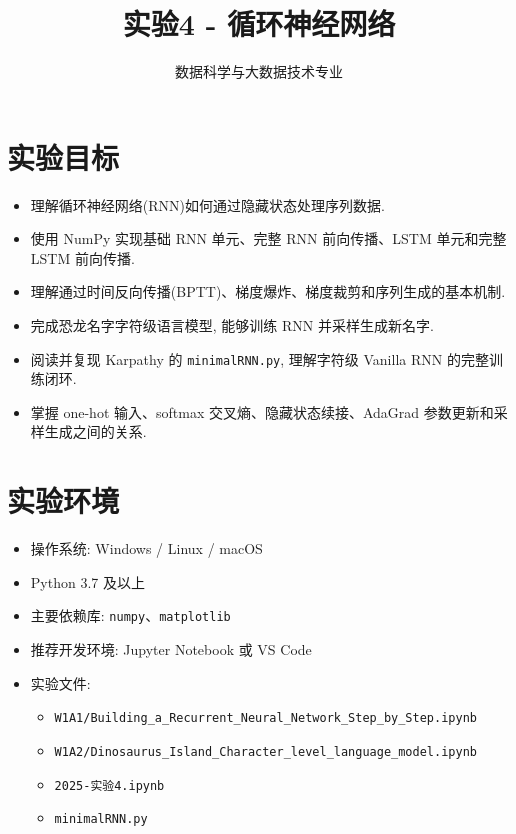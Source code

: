 \documentclass{../../nndlcourse}
\begin{document}
\title{实验4 - 循环神经网络}
\author{数据科学与大数据技术专业}
\date{}
\maketitle


\section{实验目标}
\begin{itemize}
    \item 理解循环神经网络(RNN)如何通过隐藏状态处理序列数据.
    \item 使用 NumPy 实现基础 RNN 单元、完整 RNN 前向传播、LSTM 单元和完整 LSTM 前向传播.
    \item 理解通过时间反向传播(BPTT)、梯度爆炸、梯度裁剪和序列生成的基本机制.
    \item 完成恐龙名字字符级语言模型, 能够训练 RNN 并采样生成新名字.
    \item 阅读并复现 Karpathy 的 \texttt{minimalRNN.py}, 理解字符级 Vanilla RNN 的完整训练闭环.
    \item 掌握 one-hot 输入、softmax 交叉熵、隐藏状态续接、AdaGrad 参数更新和采样生成之间的关系.
\end{itemize}


\section{实验环境}
\begin{itemize}
    \item 操作系统: Windows / Linux / macOS
    \item Python 3.7 及以上
    \item 主要依赖库: \texttt{numpy}、\texttt{matplotlib}
    \item 推荐开发环境: Jupyter Notebook 或 VS Code
    \item 实验文件:
    \begin{itemize}
        \item \texttt{W1A1/Building\_a\_Recurrent\_Neural\_Network\_Step\_by\_Step.ipynb}
        \item \texttt{W1A2/Dinosaurus\_Island\_Character\_level\_language\_model.ipynb}
        \item \texttt{2025-实验4.ipynb}
        \item \texttt{minimalRNN.py}
    \end{itemize}
\end{itemize}
\end{document}
